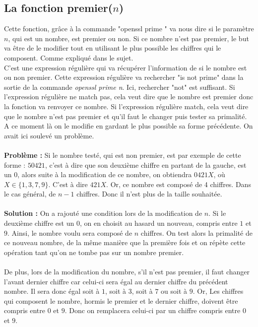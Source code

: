 \documentclass[12pt]{article}
\theoremstyle{definition}
\begin{document}
	\subsection{La fonction \textsf{premier($n$)}}
	Cette fonction, grâce à la commande "openssl prime " va nous dire si le paramètre $n$, qui est un nombre, est premier ou non. Si ce nombre n'est pas premier, le but va être de le modifier tout en utilisant le plus possible les chiffres qui le composent. Comme expliqué dans le sujet. \\
C'est une expression régulière qui va récupérer l'information de si le nombre est ou non premier. Cette expression régulière va rechercher "is not prime" dans la sortie de la commande \textit{openssl prime n}. Ici, rechercher "not" est suffisant. Si l'expression régulière ne match pas, cela veut dire que le nombre est premier donc la fonction va renvoyer ce nombre. Si l'expression régulière match, cela veut dire que le nombre n'est pas premier et qu'il faut le changer puis tester sa primalité.\\
A ce moment là on le modifie en gardant le plus possible sa forme précédente. On avait ici soulevé un problème.\\\\
\textbf{Problème : }Si le nombre testé, qui est non premier, est par exemple de cette forme : $50421$, c'est à dire que son deuxième chiffre en partant de la gauche, est un $0$, alors suite à la modification de ce nombre, on obtiendra $0421X$, où $X \in \lbrace 1,3,7,9 \rbrace$. C'est à dire $421X$. Or, ce nombre est composé de 4 chiffres. Dans le cas général, de $n-1$ chiffres. Donc il n'est plus de la taille souhaitée. \\\\
\textbf{Solution : }On a rajouté une condition lors de la modification de $n$. Si le deuxième chiffre est un $0$, on en choisit au hasard un nouveau, compris entre $1$ et $9$. Ainsi, le nombre voulu sera composé de $n$ chiffres. On test alors la primalité de ce nouveau nombre, de la même manière que la première fois et on répète cette opération tant qu'on ne tombe pas sur un nombre premier.\\\\
De plus, lors de la modification du nombre, s'il n'est pas premier, il faut changer l'avant dernier chiffre car celui-ci sera égal au dernier chiffre du précédent nombre. Il sera donc égal soit à $1$, soit à $3$, soit à $7$ ou soit à $9$. Or, Les chiffres qui composent le nombre, hormis le premier et le dernier chiffre, doivent être compris entre $0$ et $9$. Donc on remplacera celui-ci par un chiffre compris entre $0$ et $9$.
\end{document}
